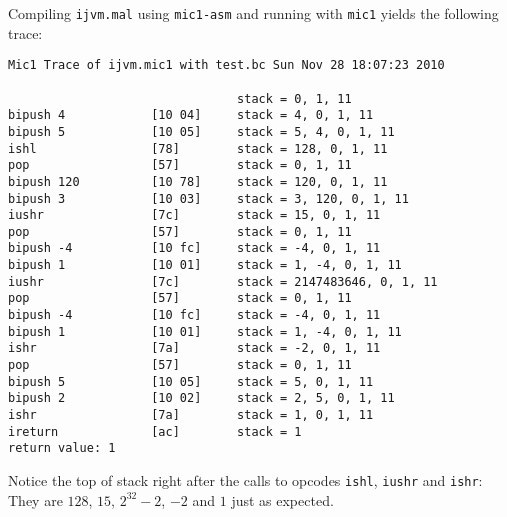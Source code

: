 \documentclass[12pt,a4paper]{article}
\newcommand{\ishl}{\texttt{ishl}}
\newcommand{\ishr}{\texttt{ishr}}
\newcommand{\iushr}{\texttt{iushr}}
\newcommand{\ijvmmal}{\texttt{ijvm.mal}}
\begin{document}
Compiling \ijvmmal{} using \texttt{mic1-asm} and running with \texttt{mic1}
yields the following trace:
\begin{lstlisting}
Mic1 Trace of ijvm.mic1 with test.bc Sun Nov 28 18:07:23 2010

                                stack = 0, 1, 11
bipush 4            [10 04]     stack = 4, 0, 1, 11
bipush 5            [10 05]     stack = 5, 4, 0, 1, 11
ishl                [78]        stack = 128, 0, 1, 11
pop                 [57]        stack = 0, 1, 11
bipush 120          [10 78]     stack = 120, 0, 1, 11
bipush 3            [10 03]     stack = 3, 120, 0, 1, 11
iushr               [7c]        stack = 15, 0, 1, 11
pop                 [57]        stack = 0, 1, 11
bipush -4           [10 fc]     stack = -4, 0, 1, 11
bipush 1            [10 01]     stack = 1, -4, 0, 1, 11
iushr               [7c]        stack = 2147483646, 0, 1, 11
pop                 [57]        stack = 0, 1, 11
bipush -4           [10 fc]     stack = -4, 0, 1, 11
bipush 1            [10 01]     stack = 1, -4, 0, 1, 11
ishr                [7a]        stack = -2, 0, 1, 11
pop                 [57]        stack = 0, 1, 11
bipush 5            [10 05]     stack = 5, 0, 1, 11
bipush 2            [10 02]     stack = 2, 5, 0, 1, 11
ishr                [7a]        stack = 1, 0, 1, 11
ireturn             [ac]        stack = 1
return value: 1
\end{lstlisting}
Notice the top of stack right after the calls to opcodes \ishl, \iushr{} and
\ishr: They are $128$, $15$, $2^{32}-2$, $-2$ and $1$ just as expected.
\end{document}
